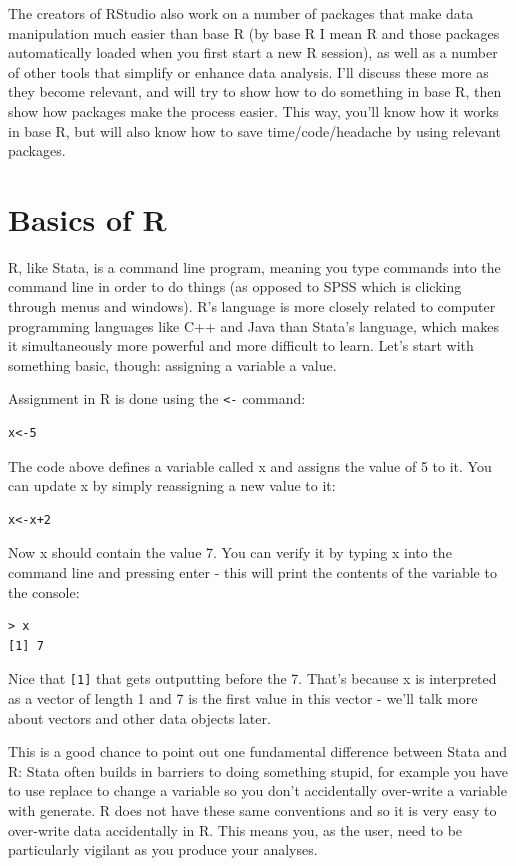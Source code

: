 \documentclass[12pt, oneside]{amsart}   	%
\begin{document}
The creators of RStudio also work on a number of packages that make data manipulation much easier than base R (by base R I mean R and those packages automatically loaded when you first start a new R session), as well as a number of other tools that simplify or enhance data analysis. I'll discuss these more as they become relevant, and will try to show how to do something in base R, then show how packages make the process easier. This way, you'll know how it works in base R, but will also know how to save time/code/headache by using relevant packages.

\section{Basics of R}

R, like Stata, is a command line program, meaning you type commands into the command line in order to do things (as opposed to SPSS which is clicking through menus and windows). R's language is more closely related to computer programming languages like C++ and Java than Stata's language, which makes it simultaneously more powerful and more difficult to learn. Let's start with something basic, though: assigning a variable a value.

Assignment in R is done using the \texttt{<-} command:

\begin{lstlisting}
x<-5
\end{lstlisting}

The code above defines a variable called x and assigns the value of 5 to it. You can update x by simply reassigning a new value to it:

\begin{lstlisting}
x<-x+2
\end{lstlisting}

Now x should contain the value 7. You can verify it by typing x into the command line and pressing enter - this will print the contents of the variable to the console:

\begin{lstlisting}
> x
[1] 7
\end{lstlisting}

Nice that \texttt{[1]} that gets outputting before the 7. That's because x is interpreted as a vector of length 1 and 7 is the first value in this vector - we'll talk more about vectors and other data objects later. 

This is a good chance to point out one fundamental difference between Stata and R: Stata often builds in barriers to doing something stupid, for example you have to use replace to change a variable so you don't accidentally over-write a variable with generate. R does not have these same conventions and so it is very easy to over-write data accidentally in R. This means you, as the user, need to be particularly vigilant as you produce your analyses.
\end{document}
